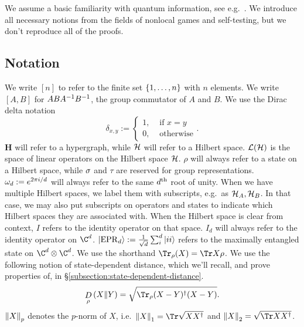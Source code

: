 We assume a basic familiarity with quantum information, see e.g.\ \cite{nielsen2002quantum}. We introduce all necessary notions from the fields of nonlocal games and self-testing, but we don't reproduce all of the proofs.


\subsection{Notation}
We write $[n]$ to refer to the finite set $\left\{1,\ldots, n\right\}$ with $n$ elements. We write $[A,B]$ for $ABA^{-1}B^{-1}$, the group commutator of $A$ and $B$.
We use the Dirac delta notation 
\begin{equation}
	\delta_{x,y} :=\begin{cases}
		1, &\text{ if }x=y\\
		0, &\text{ otherwise}
	\end{cases}.
\end{equation}
$\mathbf H$ will refer to a hypergraph, while 
$\mathcal H$ will refer to a Hilbert space.
$\mathcal L(\mathcal H)$ is the space of linear operators on the Hilbert space $\mathcal H$. 
$\rho$ will always refer to a state on a Hilbert space, while $\sigma$ and $\tau$ are reserved for group representations. $\omega_d:= e^{2\pi i /d}$ will always refer to the same $d\textsuperscript{th}$ root of unity. 
When we have multiple Hilbert spaces, we label them with subscripts, e.g.\ as $\mathcal H_A, \mathcal H_B$. In that case, we may also put subscripts on operators and states to indicate which Hilbert spaces they are associated with. 
When the Hilbert space is clear from context, $I$ refers to the identity operator on that space. 
$I_d$ will always refer to the identity operator on $\C^d$. 
$\ket{\mathrm{EPR}_d}:=\frac{1}{\sqrt d}\sum_i^d\ket{ii}$ refers to the maximally entangled state on $\C^d\otimes \C^d$. We use the shorthand $\Tr_\rho(X) = \Tr X\rho$. 
We use the following notion of state-dependent distance, which we'll recall, and prove properties of, in \S\ref{subsection:state-dependent-distance}.
\begin{equation}\label{eq:state-dependent-distance-definition}
	\drho{\rho}{X}{Y} = \sqrt{\Tr_\rho(X-Y)^\dagger(X-Y)}.
\end{equation}
$\left\Vert X\right\Vert_p$ denotes the $p$-norm of $X$, i.e.\ $\norm X_1 = \Tr\sqrt{XX^\dagger}$ and $\norm X_2 = \sqrt{\Tr XX^\dagger}$.

